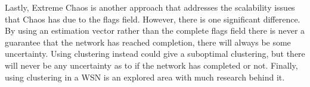 Lastly, Extreme Chaos is another approach that addresses the scalability issues that Chaos has due to the flags field. However, there is one significant difference. By using an estimation vector rather than the complete flags field there is never a guarantee that the network has reached completion, there will always be some uncertainty. Using clustering instead could give a suboptimal clustering, but there will never be any uncertainty as to if the network has completed or not. Finally, using clustering in a WSN is an explored area with much research behind it. 
